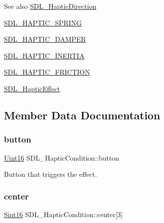 \begin{DoxySeeAlso}{See also}
\mbox{\hyperlink{struct_s_d_l___haptic_direction}{S\+D\+L\+\_\+\+Haptic\+Direction}} 

\mbox{\hyperlink{_s_d_l__haptic_8h_a3b52d4700380085e2b5d87bb20320fb1}{S\+D\+L\+\_\+\+H\+A\+P\+T\+I\+C\+\_\+\+S\+P\+R\+I\+NG}} 

\mbox{\hyperlink{_s_d_l__haptic_8h_a69522f261973e3ea4273486141320a87}{S\+D\+L\+\_\+\+H\+A\+P\+T\+I\+C\+\_\+\+D\+A\+M\+P\+ER}} 

\mbox{\hyperlink{_s_d_l__haptic_8h_a14b807471589120395aec28293cf6642}{S\+D\+L\+\_\+\+H\+A\+P\+T\+I\+C\+\_\+\+I\+N\+E\+R\+T\+IA}} 

\mbox{\hyperlink{_s_d_l__haptic_8h_a98a5011311168d63921aaac21403a4d8}{S\+D\+L\+\_\+\+H\+A\+P\+T\+I\+C\+\_\+\+F\+R\+I\+C\+T\+I\+ON}} 

\mbox{\hyperlink{union_s_d_l___haptic_effect}{S\+D\+L\+\_\+\+Haptic\+Effect}} 
\end{DoxySeeAlso}


\subsection{Member Data Documentation}
\mbox{\label{struct_s_d_l___haptic_condition_acd35a9d432ad122bf7824b16974eac7a}} 
\subsubsection{\texorpdfstring{button}{button}}
{\footnotesize\ttfamily \mbox{\hyperlink{_s_d_l__stdinc_8h_a31fcc0a076c9068668173ee26d33e42b}{Uint16}} S\+D\+L\+\_\+\+Haptic\+Condition\+::button}

Button that triggers the effect. \mbox{\label{struct_s_d_l___haptic_condition_a8a71ec28ff5ab85246cbc59736aa2c53}} 
\subsubsection{\texorpdfstring{center}{center}}
{\footnotesize\ttfamily \mbox{\hyperlink{_s_d_l__stdinc_8h_a9d0257032c0e146ab6121bf0122712f5}{Sint16}} S\+D\+L\+\_\+\+Haptic\+Condition\+::center\mbox{[}3\mbox{]}}

